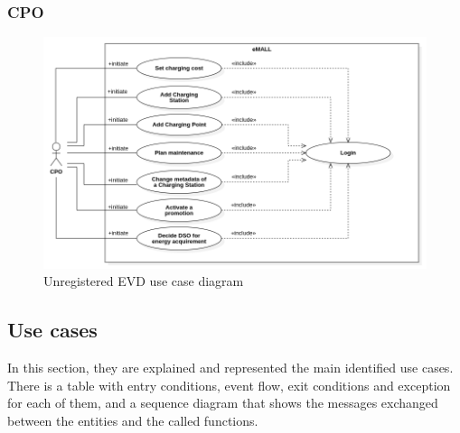 \subsubsection*{CPO}
\begin{figure} [H]
    \begin{center}
        \includegraphics[width=0.9\linewidth]{Images/UseCaseDiagrams/CPO_use_case_diagram}
        \caption{Unregistered EVD use case diagram}
        \label{fig: cpo_diag}
    \end{center}
\end{figure}

\subsection{Use cases}
\label{subsec: use_cases}%
In this section, they are explained and represented the main identified use cases.
There is a table with entry conditions, event flow, exit conditions and exception for each of them, and a sequence diagram
that shows the messages exchanged between the entities and the called functions. \\
